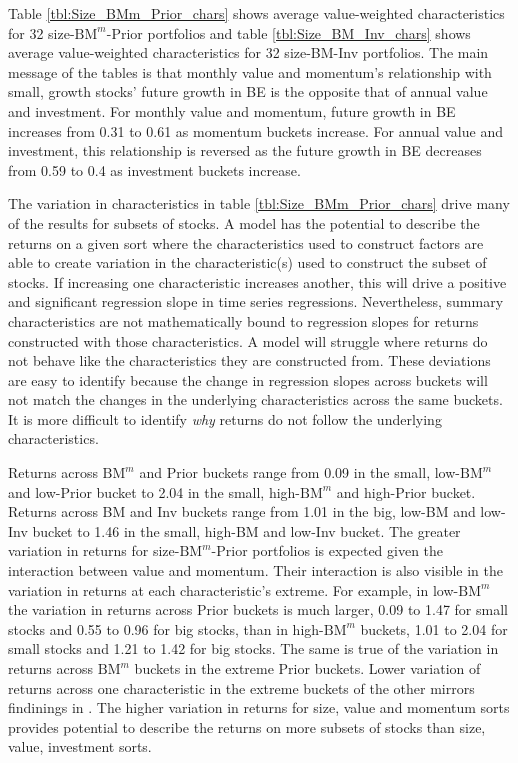 
Table \ref{tbl:Size_BMm_Prior_chars} shows average value-weighted
characteristics for 32 size-$\text{BM}^m$-Prior portfolios and table
\ref{tbl:Size_BM_Inv_chars} shows average value-weighted characteristics for 32
size-BM-Inv portfolios. The main message of the tables is that monthly value
and momentum's relationship with small, growth stocks' future growth in BE is
the opposite that of annual value and investment. For monthly value and
momentum, future growth in BE increases from 0.31 to 0.61 as momentum buckets
increase. For annual value and investment, this relationship is reversed as the
future growth in BE decreases from 0.59 to 0.4 as investment buckets increase.

The variation in characteristics in table \ref{tbl:Size_BMm_Prior_chars} drive
many of the results for subsets of stocks. 
A model has the potential to describe the
returns on a given sort where the characteristics used to construct factors are
able to create variation in the characteristic(s) used to construct the subset
of stocks. If increasing one characteristic increases another, this will drive
a positive and significant regression slope in time series regressions.
Nevertheless, summary characteristics are not mathematically bound to
regression slopes for returns constructed with those characteristics.
A model will struggle where returns do not behave like the characteristics they
are constructed from.
These deviations are easy to identify because the change in
regression slopes across buckets will not match the changes in the underlying
characteristics across the same buckets. It is more difficult to identify
\emph{why} returns do not follow the underlying characteristics.

Returns across $\text{BM}^m$ and Prior buckets range from 0.09 in the small,
low-$\text{BM}^m$ and low-Prior bucket to 2.04 in the small, high-$\text{BM}^m$
and high-Prior bucket. Returns across BM and Inv buckets range from 1.01 in the
big, low-BM and low-Inv bucket to 1.46 in the small, high-BM and low-Inv
bucket. The greater variation in returns for size-$\text{BM}^m$-Prior
portfolios is expected given the interaction between value and momentum. Their
interaction is also visible in the variation in returns at each
characteristic's extreme. For example, in low-$\text{BM}^m$ the variation in
returns across Prior buckets is much larger, 0.09 to 1.47 for small stocks and
0.55 to 0.96 for big stocks, than in high-$\text{BM}^m$ buckets, 1.01 to 2.04
for small stocks and 1.21 to 1.42 for big stocks. The same is true of the
variation in returns across $\text{BM}^m$ buckets in the extreme Prior buckets.
Lower variation of returns across one characteristic in the extreme buckets of
the other mirrors findinings in \textcite{asness2013devil}. The higher
variation in returns for size, value and momentum sorts provides potential to
describe the returns on more subsets of stocks than size, value, investment
sorts.

